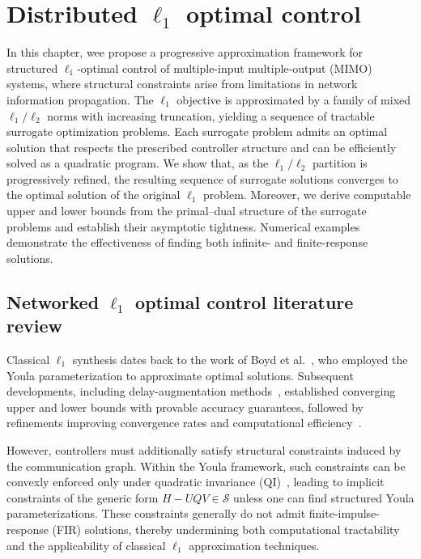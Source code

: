 \chapter{Distributed \(\ell_1\) optimal control}
\label{chap:l1ctrl}
In this chapter, wee propose a progressive approximation framework for structured $\ell_1$-optimal control of multiple-input multiple-output (MIMO) systems, where structural constraints arise from limitations in network information propagation. The $\ell_1$ objective is approximated by a family of mixed $\ell_1/\ell_2$ norms with increasing truncation, yielding a sequence of tractable surrogate optimization problems. Each surrogate problem admits an optimal solution that respects the prescribed controller structure and can be efficiently solved as a quadratic program. We show that, as the $\ell_1/\ell_2$ partition is progressively refined, the resulting sequence of surrogate solutions converges to the optimal solution of the original $\ell_1$ problem. Moreover, we derive computable upper and lower bounds from the primal--dual structure of the surrogate problems and establish their asymptotic tightness. Numerical examples demonstrate the effectiveness of finding both infinite- and finite-response solutions.


\section{Networked \(\ell_1\) optimal control literature review}
Classical $\ell_1$ synthesis dates back to the work of Boyd et al.~\cite{boyd1991linear}, who employed the Youla parameterization to approximate optimal solutions. Subsequent developments, including delay-augmentation methods~\cite{Bobillo1993DA, Dahleh1995Control}, established converging upper and lower bounds with provable accuracy guarantees, followed by refinements improving convergence rates and computational efficiency~\cite{Sznaier1995MIMOl1, Khammash1996ScaledQ, Elia1998qpl1, Khammash2000scaledQ}.

However, controllers must additionally satisfy structural constraints induced by the communication graph. Within the Youla framework, such constraints can be convexly enforced only under quadratic invariance (QI)~\cite{LessardQI, SanjayLQIsufficient, SabauVectorization}, leading to implicit constraints of the generic form $H - U Q V \in \mathcal{S}$ unless one can find structured Youla parameterizations. These constraints generally do not admit finite-impulse-response (FIR) solutions, thereby undermining both computational tractability and the applicability of classical $\ell_1$ approximation techniques.


